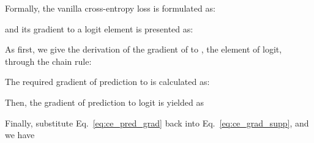 \documentclass[letterpaper]{article} \usepackage{aaai23}  \usepackage{times}  \usepackage{helvet}  \usepackage{courier}  \usepackage[hyphens]{url}  \usepackage{graphicx} \urlstyle{rm} \def\UrlFont{\rm}  \usepackage{natbib}  \usepackage{caption} \frenchspacing  \setlength{\pdfpagewidth}{8.5in}  \setlength{\pdfpageheight}{11in}  \usepackage{algorithm}
\begin{document}
Formally, the vanilla cross-entropy loss is formulated as:
\begin{small}
  
\end{small}and its gradient to a logit element  is presented as:
\begin{small}
  
\end{small}As first, we give the derivation of the gradient of  to , the  element of logit, through the chain rule:
\begin{small}
  
\end{small}The required gradient of prediction  to  is calculated as:
\begin{small}
  
\end{small}Then, the gradient of prediction to logit is yielded as
\begin{small}
  
\end{small}Finally, substitute Eq.~\eqref{eq:ce_pred_grad} back into Eq.~\eqref{eq:ce_grad_supp}, and we have
\begin{small}
  
\end{small}
\end{document}
